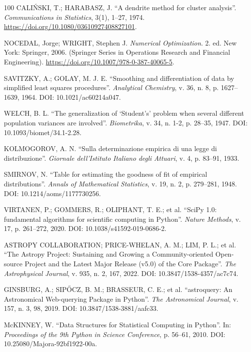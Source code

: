 \documentclass[msc]{on} %
\begin{document}
\begin{thebibliography}{100}
 CALI\'{N}SKI, T.; HARABASZ, J. ``A dendrite method for cluster analysis''. \emph{Communications in Statistics}, 3(1), 1--27, 1974. \url{https://doi.org/10.1080/03610927408827101}.

 NOCEDAL, Jorge; WRIGHT, Stephen J. \textit{Numerical Optimization}. 2. ed. New York: Springer, 2006. (Springer Series in Operations Research and Financial Engineering). \url{https://doi.org/10.1007/978-0-387-40065-5}.

 SAVITZKY, A.; GOLAY, M. J. E. ``Smoothing and differentiation of data by simplified least squares procedures''. \emph{Analytical Chemistry}, v. 36, n. 8, p. 1627--1639, 1964. DOI: 10.1021/ac60214a047.

 WELCH, B. L. ``The generalization of `Student's' problem when several different population variances are involved''. \emph{Biometrika}, v. 34, n. 1-2, p. 28--35, 1947. DOI: 10.1093/biomet/34.1-2.28.

 KOLMOGOROV, A. N. ``Sulla determinazione empirica di una legge di distribuzione''. \emph{Giornale dell'Istituto Italiano degli Attuari}, v. 4, p. 83--91, 1933.

 SMIRNOV, N. ``Table for estimating the goodness of fit of empirical distributions''. \emph{Annals of Mathematical Statistics}, v. 19, n. 2, p. 279--281, 1948. DOI: 10.1214/aoms/1177730256.

 VIRTANEN, P.; GOMMERS, R.; OLIPHANT, T. E.; et al. ``SciPy 1.0: fundamental algorithms for scientific computing in Python''. \emph{Nature Methods}, v. 17, p. 261--272, 2020. DOI: 10.1038/s41592-019-0686-2.

 ASTROPY COLLABORATION; PRICE-WHELAN, A. M.; LIM, P. L.; et al. ``The Astropy Project: Sustaining and Growing a Community-oriented Open-source Project and the Latest Major Release (v5.0) of the Core Package''. \emph{The Astrophysical Journal}, v. 935, n. 2, 167, 2022. DOI: 10.3847/1538-4357/ac7c74.

 GINSBURG, A.; SIP\H{O}CZ, B. M.; BRASSEUR, C. E.; et al. ``astroquery: An Astronomical Web-querying Package in Python''. \emph{The Astronomical Journal}, v. 157, n. 3, 98, 2019. DOI: 10.3847/1538-3881/aafc33.

 McKINNEY, W. ``Data Structures for Statistical Computing in Python''. In: \emph{Proceedings of the 9th Python in Science Conference}, p. 56--61, 2010. DOI: 10.25080/Majora-92bf1922-00a.

%
\end{thebibliography}

\appendix



\end{document}
